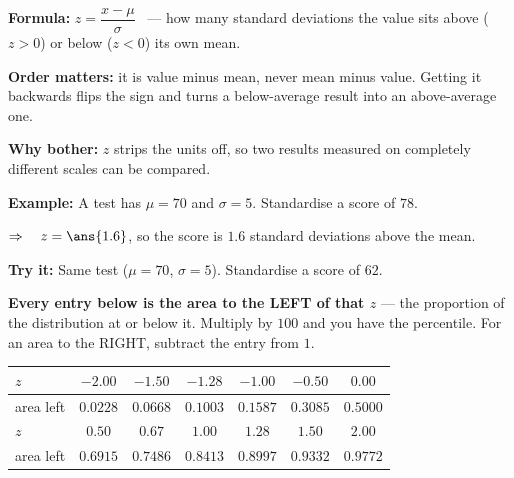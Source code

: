 \documentclass[12pt]{article}
\begin{document}


\begin{formulabox}
\textbf{Formula:} $z = \dfrac{x - \mu}{\sigma}$ \ --- how many standard deviations the value sits above ($z>0$) or below ($z<0$) its own mean.\par
\textbf{Order matters:} it is value minus mean, never mean minus value. Getting it backwards flips the sign and turns a below-average result into an above-average one.\par
\textbf{Why bother:} $z$ strips the units off, so two results measured on completely different scales can be compared.
\end{formulabox}

\begin{examplebox}
\textbf{Example:} \quad A test has $\mu = 70$ and $\sigma = 5$. Standardise a score of $78$.

$\Rightarrow\quad z = \ans{1.6}$, so the score is $1.6$ standard deviations above the mean.
\end{examplebox}

\begin{tryitbox}
\textbf{Try it:} \quad Same test ($\mu = 70$, $\sigma = 5$). Standardise a score of $62$.\\[2pt]
\end{tryitbox}


\begin{formulabox}
\textbf{Every entry below is the area to the LEFT of that $z$} --- the proportion of the distribution at or below it. Multiply by $100$ and you have the percentile. For an area to the RIGHT, subtract the entry from $1$.
\par\vspace{2pt}
\footnotesize
\begin{tabular}{|l|c|c|c|c|c|c|}
\hline
$z$ & $-2.00$ & $-1.50$ & $-1.28$ & $-1.00$ & $-0.50$ & $0.00$ \\ \hline
area left & $0.0228$ & $0.0668$ & $0.1003$ & $0.1587$ & $0.3085$ & $0.5000$ \\ \hline
$z$ & $0.50$ & $0.67$ & $1.00$ & $1.28$ & $1.50$ & $2.00$ \\ \hline
area left & $0.6915$ & $0.7486$ & $0.8413$ & $0.8997$ & $0.9332$ & $0.9772$ \\ \hline
\end{tabular}
\end{formulabox}
\end{document}
